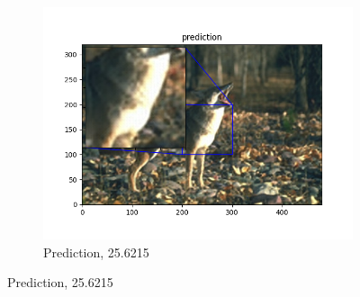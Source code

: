 \documentclass[12pt]{article}
\begin{document}
\begin{figure}[h!]
\begin{subfigure}[b]{0.32\linewidth}
    \includegraphics[width=\linewidth]{./1-prediction.png}
    \caption{Prediction, 25.6215}
  \end{subfigure}


\end{figure}
\end{document}
